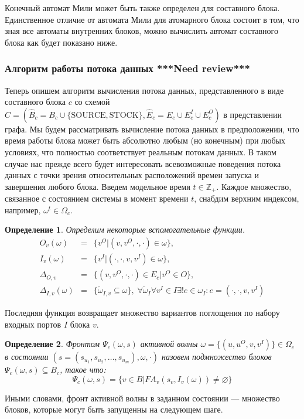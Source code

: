 \documentclass[10pt,a4paper]{article}
\newtheorem{defen}{Определение}
\newcommand{\stock}{\text{STOCK}}
\newcommand{\source}{\text{SOURCE}}
\newcommand{\FA}{F\!A}
\begin{document}
Конечный автомат Мили может быть также определен для составного блока. Единственное отличие от автомата Мили для атомарного блока состоит в том, что
зная все автоматы внутренних блоков, можно вычислить автомат составного блока как будет показано ниже.

\subsubsection{Алгоритм работы потока данных \textbf{***Need review***}}
Теперь опишем алгоритм вычисления потока данных, представленного в виде составного блока $c$ со схемой
$C = (\hat{B}_c = B_c \cup \{\source, \stock\}, \hat{E}_c= E_c \cup E^I_c \cup E^O_c)$ в представлении графа.
Мы будем рассматривать вычисление потока данных в предположении,
что время работы блока может быть абсолютно любым (но конечным) при любых условиях, что полностью соответствует реальным потокам данных.
В таком случае нас прежде всего будет интересовать всевозможные поведения потока данных с точки зрения относительных расположений времен запуска и завершения любого блока.
Введем модельное время $t \in \mathbb{Z}_+$.
Каждое множество, связанное с состоянием системы в момент времени $t$, снабдим верхним индексом, например, $\omega^t \in \Omega_c$.

\begin{defen}
  Определим некоторые вспомогательные функции.
  \begin{eqnarray*}
    O_v(\omega) & = & \{v^O \vert (v, v^O, \cdot, \cdot) \in \omega\}, \\
    I_v(\omega) & = & \{v^I \vert (\cdot, \cdot, v, v^I) \in \omega\}, \\
    \Delta_{O, v} & = & \{(v, v^O, \cdot, \cdot) \in E_c \vert v^O \in O\}, \\
    \Delta_{I, v} (\omega) & = & \{\tilde \omega_{I, v} \subseteq \omega \}, \; \forall \tilde \omega_I \forall v^I \in I \exists ! e \in \omega_I: e = (\cdot, \cdot, v, v^I)
  \end{eqnarray*}
\end{defen}
Последняя функция возвращает множество вариантов поглощения по набору входных портов $I$ блока $v$.

\begin{defen}
  Фронтом $\Psi_c (\omega, s)$ активной волны $\omega = \{(u, u^O, v, v^I)\} \in \Omega_c$ в состоянии $(s = (s_{u_1}, s_{u_2}, \dots, s_{u_m}), \omega, \cdot)$
  назовем подмножество блоков $\Psi_c (\omega, s) \subseteq B_c$, такое что:
  $$\Psi_c (\omega, s) = \{ v \in B \vert \FA_v(s_v, I_v(\omega)) \neq \varnothing\}$$
\end{defen}
Иными словами, фронт активной волны в заданном состоянии --- множество блоков, которые могут быть запущенны на следующем шаге.
\end{document}
